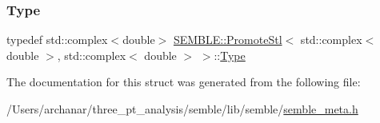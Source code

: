 \mbox{\label{structSEMBLE_1_1PromoteStl_3_01std_1_1complex_3_01double_01_4_00_01std_1_1complex_3_01double_01_4_01_4_a4204146a4eeb0fb567fb999f49c4e933}} 
\subsubsection{\texorpdfstring{Type}{Type}\hspace{0.1cm}{\footnotesize\ttfamily [2/2]}}
{\footnotesize\ttfamily typedef std\+::complex$<$double$>$ \mbox{\hyperlink{structSEMBLE_1_1PromoteStl}{S\+E\+M\+B\+L\+E\+::\+Promote\+Stl}}$<$ std\+::complex$<$ double $>$, std\+::complex$<$ double $>$ $>$\+::\mbox{\hyperlink{structSEMBLE_1_1PromoteStl_3_01std_1_1complex_3_01double_01_4_00_01std_1_1complex_3_01double_01_4_01_4_a4204146a4eeb0fb567fb999f49c4e933}{Type}}}



The documentation for this struct was generated from the following file\+:\begin{DoxyCompactItemize}
\item 
/\+Users/archanar/three\+\_\+pt\+\_\+analysis/semble/lib/semble/\mbox{\hyperlink{lib_2semble_2semble__meta_8h}{semble\+\_\+meta.\+h}}\end{DoxyCompactItemize}
